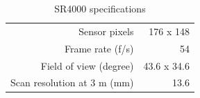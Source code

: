 \documentclass[conference]{IEEEtran}
\begin{document}
		\begin{table}[htbp]
			\caption{SR4000 specifications} %
			\centering
		\begin{tabular}{rr} %
			\hline\hline %
			Sensor pixels & 176 x 148 \\ %
			Frame rate (f/s) & 54 \\
			Field of view (degree) & 43.6 x 34.6 \\
			Scan resolution at 3 m (mm) & 13.6 \\[1ex] %
			\hline %
		\end{tabular}
		\label{tab:sr4000_spec}
		\end{table}
		
		
	\nocite{*}
	\printbibliography
	
\end{document}
